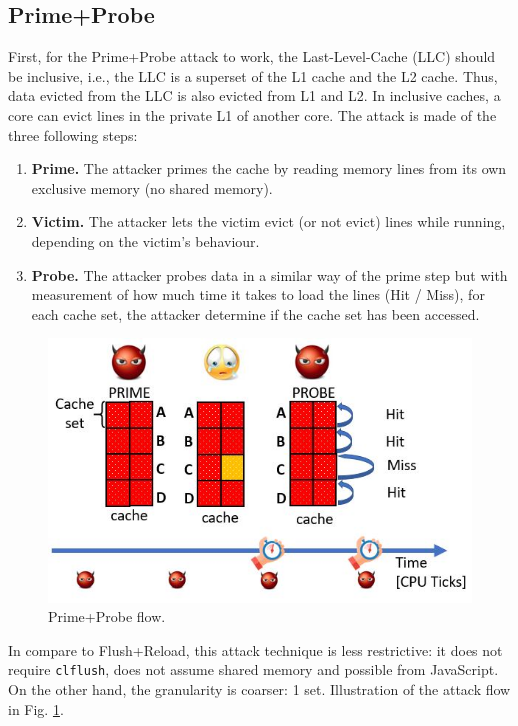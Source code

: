 \subsection{Prime+Probe}
First, for the Prime+Probe attack to work, the Last-Level-Cache (LLC) should be inclusive, i.e., the LLC is a superset of the L1 cache and the L2 cache. Thus, data evicted from the LLC is also evicted from L1 and L2.
In inclusive caches, a core can evict lines in the private L1 of another core.
The attack is made of the three following steps:
\begin{enumerate}
    \item \textbf{Prime.} The attacker primes the cache by reading memory lines from its own exclusive memory (no shared memory).
    \item \textbf{Victim.} The attacker lets the victim evict (or not evict) lines while running, depending on the victim's behaviour.
    \item \textbf{Probe.} The attacker probes data in a similar way of the prime step but with measurement of how much time it takes to load the lines (Hit / Miss), for each cache set, the attacker determine if the cache set has been accessed.
\end{enumerate}

\begin{figure}[h]
    \centering
    \includegraphics[width=\textwidth]{images/pp_flow.JPG}
    \caption{Prime+Probe flow.}
    \label{fig:pp_flow}
\end{figure}

\noindent In compare to Flush+Reload, this attack technique is less restrictive: it does not require \texttt{clflush}, does not assume shared memory and possible from JavaScript. On the other hand, the granularity is coarser: 1 set.  Illustration of the attack flow in Fig. \ref{fig:pp_flow}.

